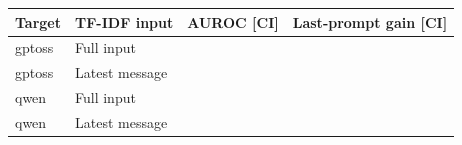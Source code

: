 \begin{tabular}{llll}
\toprule
Target & TF-IDF input & AUROC [CI] & Last-prompt gain [CI] \\
\midrule
gptoss & Full input & \gptossTextFull{} \gptossTextFullCI{} & \gptossProbeMinusTextFull{} \gptossProbeMinusTextFullCI{} \\
gptoss & Latest message & \gptossTextLatest{} \gptossTextLatestCI{} & \gptossProbeMinusTextLatest{} \gptossProbeMinusTextLatestCI{} \\
qwen & Full input & \qwenTextFull{} \qwenTextFullCI{} & \qwenProbeMinusTextFull{} \qwenProbeMinusTextFullCI{} \\
qwen & Latest message & \qwenTextLatest{} \qwenTextLatestCI{} & \qwenProbeMinusTextLatest{} \qwenProbeMinusTextLatestCI{} \\
\bottomrule
\end{tabular}
